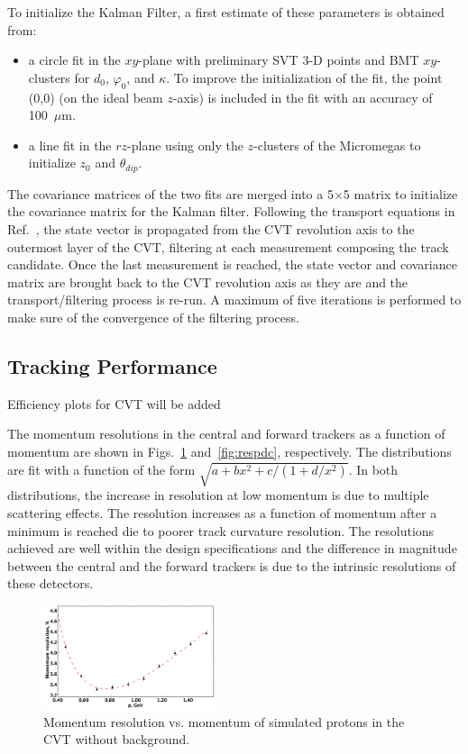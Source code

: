 To initialize the Kalman Filter, a first estimate of these parameters is obtained from:

\begin{itemize}
\item a circle fit in the $xy$-plane with preliminary SVT 3-D points and BMT $xy$-clusters for $d_0$,
  $\varphi_0$, and $\kappa$. To improve the initialization of the fit, the point (0,0) (on the ideal beam $z$-axis)
  is included in the fit with an accuracy of 100~$\mu$m.
\item a line fit in the $rz$-plane using only the $z$-clusters of the Micromegas to initialize $z_0$ and $\theta_{dip}$.
\end{itemize}

The covariance matrices of the two fits are merged into a 5$\times$5 matrix to initialize the covariance matrix
for the Kalman filter. Following the transport equations in Ref.~\cite{ILC-Tracking}, the state vector is
propagated from the CVT revolution axis to the outermost layer of the CVT, filtering at each measurement
composing the track candidate. Once the last measurement is reached, the state vector and covariance matrix
are brought back to the CVT revolution axis as they are and the transport/filtering process is re-run. A maximum
of five iterations is performed to make sure of the convergence of the filtering process.

\subsection{Tracking Performance}
{\color{red} Efficiency plots for CVT will be added}

The momentum resolutions in the central and forward trackers as a function of momentum are shown in
Figs.~\ref{fig:respcvt} and~\ref{fig:respdc}, respectively. The distributions are fit with a function of the form
$\sqrt{a+b x^2+c/(1+d/x^2)}$.  In both distributions, the increase in resolution at low momentum is due to multiple scattering effects.  The resolution increases as a function of momentum after a minimum is reached die to poorer track curvature resolution.  The resolutions achieved are well within the design specifications and the
difference in magnitude between the central and the forward trackers is due to the intrinsic resolutions of these
detectors. 

\begin{figure}
\includegraphics[width=0.45\textwidth]{pics/fddegipekmpjjiho.png}
\caption{Momentum resolution vs. momentum of simulated protons in the CVT without background.}
\label{fig:respcvt}
\end{figure}

